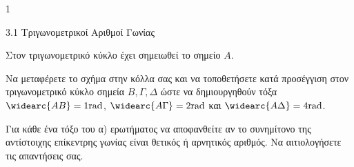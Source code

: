 \begin{ylh}{1}
\item 3.1 Τριγωνομετρικοί Αριθμοί Γωνίας
\end{ylh}
\begin{center}
\end{center}
Στον τριγωνομετρικό κύκλο έχει σημειωθεί το σημείο $A$.
\begin{alist}
\item Να μεταφέρετε το σχήμα στην κόλλα σας και να τοποθετήσετε κατά προσέγγιση στον τριγωνομετρικό κύκλο σημεία $B, \Gamma, \Delta$ ώστε να δημιουργηθούν τόξα $\widearc{AB} = 1\text{rad}$, $\widearc{A\Gamma} = 2\text{rad}$ και $\widearc{A\Delta} = 4\text{rad}$. 
\item Για κάθε ένα τόξο του α) ερωτήματος να αποφανθείτε αν το συνημίτονο της αντίστοιχης επίκεντρης γωνίας είναι θετικός ή αρνητικός αριθμός. Να αιτιολογήσετε τις απαντήσεις σας. 
\end{alist}

